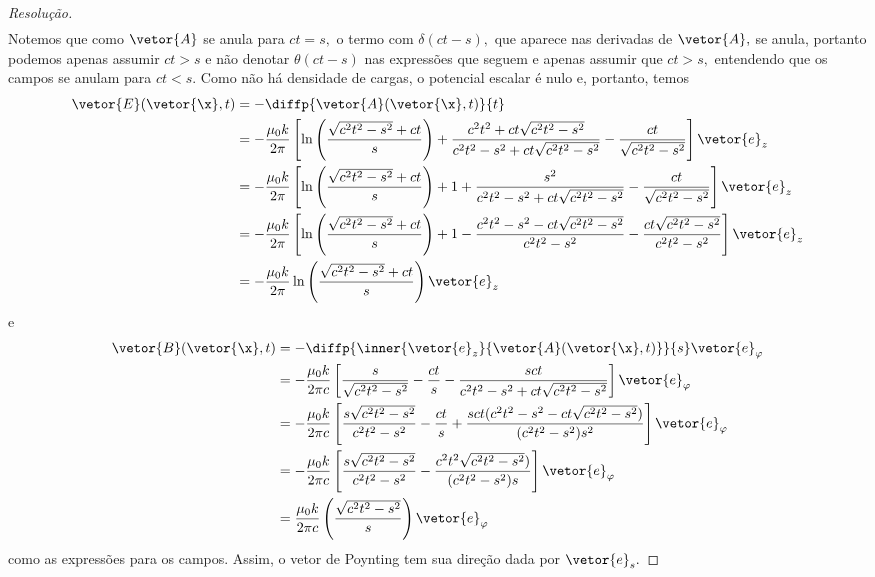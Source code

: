 \begin{proof}[Resolução]
\begin{align*}
   \end{align*}
   Notemos que como \(\vetor{A}\) se anula para \(ct = s,\) o termo com \(\delta(ct - s),\) que aparece nas derivadas de \(\vetor{A},\) se anula, portanto podemos apenas assumir \(ct > s\) e não denotar \(\theta(ct - s)\) nas expressões que seguem e apenas assumir que \(ct > s,\) entendendo que os campos se anulam para \(ct < s\). Como não há densidade de cargas, o potencial escalar é nulo e, portanto, temos
   \begin{align*}
      \vetor{E}(\vetor{\x}, t) &= -\diffp{\vetor{A}(\vetor{\x}, t)}{t}\\
      &= -\frac{\mu_0 k}{2\pi} \left[\ln\left(\frac{\sqrt{c^2 t^2 - s^2} + c t}{s}\right)  + \frac{c^2 t^2 + c t \sqrt{c^2 t^2 - s^2}}{c^2 t^2 - s^2 + c t{\sqrt{c^2 t^2 - s^2}}} - \frac{c t}{\sqrt{c^2 t^2 - s^2}}\right] \vetor{e}_z\\
      &= -\frac{\mu_0 k}{2\pi} \left[\ln\left(\frac{\sqrt{c^2 t^2 - s^2} + c t}{s}\right) + 1 + \frac{s^2}{c^2 t^2 - s^2 + c t{\sqrt{c^2 t^2 - s^2}}} - \frac{c t}{\sqrt{c^2 t^2 - s^2}}\right] \vetor{e}_z\\
      &= - \frac{\mu_0 k}{2\pi} \left[\ln\left(\frac{\sqrt{c^2 t^2 - s^2} + c t}{s}\right) + 1 - \frac{c^2 t^2 - s^2 - ct \sqrt{c^2 t^2 - s^2}}{c^2 t^2 - s^2} - \frac{ct\sqrt{c^2 t^2 - s^2}}{c^2 t^2 - s^2}\right]\vetor{e}_z\\
      &= - \frac{\mu_0 k}{2\pi} \ln\left(\frac{\sqrt{c^2 t^2 - s^2} + c t}{s}\right)\vetor{e}_z
   \end{align*}
   e
   \begin{align*}
      \vetor{B}(\vetor{\x}, t) &= -\diffp{\inner{\vetor{e}_z}{\vetor{A}(\vetor{\x}, t)}}{s}\vetor{e}_\varphi\\
      &=  -\frac{\mu_0 k}{2\pi c} \left[\frac{s}{\sqrt{c^2 t^2 - s^2}} - \frac{ct}{s} - \frac{s ct}{c^2 t^2  - s^2 + c t \sqrt{c^2 t^2 - s^2}}\right] \vetor{e}_\varphi\\
      &=-\frac{\mu_0 k}{2\pi c} \left[\frac{s\sqrt{c^2 t^2 - s^2}}{c^2 t^2 - s^2} - \frac{ct}{s} + \frac{s ct(c^2 t^2 - s^2 - ct \sqrt{c^2 t^2 - s^2})}{(c^2 t^2  - s^2)s^2}\right] \vetor{e}_\varphi\\
      &=-\frac{\mu_0 k}{2\pi c} \left[\frac{s\sqrt{c^2 t^2 - s^2}}{c^2 t^2 - s^2} - \frac{c^2 t^2\sqrt{c^2 t^2 - s^2})}{(c^2 t^2  - s^2)s}\right] \vetor{e}_\varphi\\
      &= \frac{\mu_0 k}{2\pi c} \left(\frac{\sqrt{c^2 t^2 - s^2}}{s}\right)\vetor{e}_\varphi
   \end{align*}
   como as expressões para os campos. Assim, o vetor de Poynting tem sua direção dada por \(\vetor{e}_s.\)
\end{proof}
